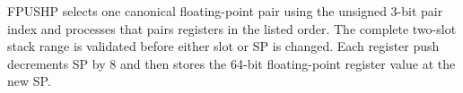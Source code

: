 FPUSHP selects one canonical floating-point pair using the unsigned 3-bit pair index and processes that pair\textquotesingle{}s registers in the listed order. The complete two-slot stack range is validated before either slot or SP is changed. Each register push decrements SP by 8 and then stores the 64-bit floating-point register value at the new SP.
